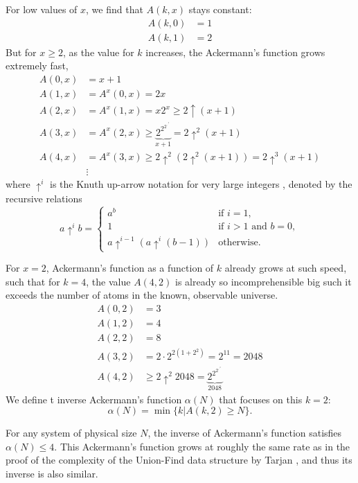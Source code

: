 For low values of $x$, we find that $A(k,x)$ stays constant:
\begin{align*}
    A(k,0) &= 1 \\
    A(k,1) &= 2
\end{align*}
But for $x\geq 2$, as the value for $k$ increases, the Ackermann's function grows extremely fast,
\begin{align*}
    A(0,x) &= x+1 \\
    A(1,x) &= A^x(0,x) = 2x  \\
    A(2,x) &= A^x(1,x) = x2^x \geq 2 \uparrow (x+1)\\
    A(3,x) &= A^x(2,x) \geq  \underbrace{2^{2^{2^{.^{.^2}}}}}_{x+1} = 2\uparrow ^2 (x+1) \\
    A(4,x) &= A^x(3,x) \geq 2\uparrow^2(2\uparrow^2(x+1)) = 2\uparrow ^3 (x+1)\\
    &\vdots
\end{align*}
where $\uparrow^i$ is the Knuth up-arrow notation for very large integers \cite{knuth1976mathematics}, denoted by the recursive relations
\begin{equation}
    a\uparrow^i b = \begin{cases}
        a^b &\text{if }i=1,\\
        1   &\text{if }i>1 \text{ and } b=0,\\
        a\uparrow^{i-1}(a \uparrow^i(b-1)) &\text{otherwise.}
    \end{cases}
\end{equation}

For $x=2$, Ackermann's function as a function of $k$ already grows at such speed, such that for $k=4$, the value $A(4,2)$ is already so incomprehensible big such it exceeds the number of atoms in the known, observable universe. 
\begin{align*}
    A(0,2) &= 3 \\
    A(1,2) &= 4  \\
    A(2,2) &= 8\\
    A(3,2) &= 2\cdot 2^{2(1+2^2)} = 2^11 = 2048\\
    A(4,2) &\geq 2\uparrow^2 2048 = \underbrace{2^{2^{2^{.^{.^2}}}}}_{2048}
\end{align*}
We define t inverse Ackermann's function $\alpha(N)$ that focuses on this $k=2$:
\begin{equation}
    \alpha(N) = \min\{k | A(k,2) \geq N \}.
\end{equation}

For any system of physical size $N$, the inverse of Ackermann's function satisfies $\alpha(N) \leq 4$. This Ackermann's function grows at roughly the same rate as in the proof of the complexity of the Union-Find data structure by Tarjan \cite{tarjan1975efficiency}, and thus its inverse is also similar.

